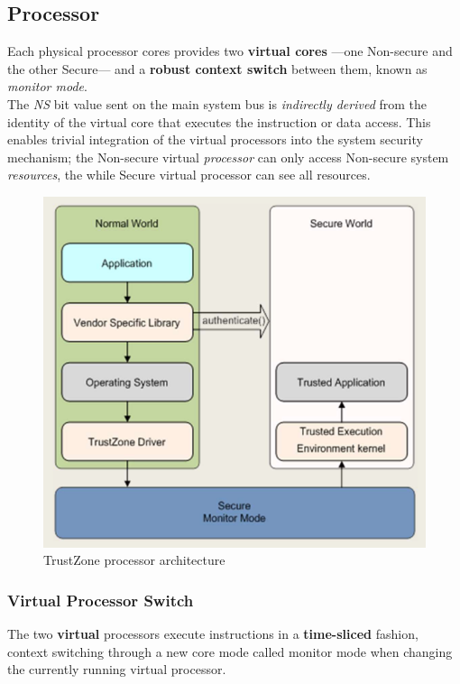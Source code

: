 \subsection{Processor}
Each physical processor cores provides
two \textbf{virtual cores} {---}one Non-secure and the other Secure{---}
and a \textbf{robust context switch} between them, known as \textit{monitor mode}.\\
The \textit{NS} bit value sent on the main system bus is \textit{indirectly derived} from
the identity of the virtual core that executes the instruction or data access.
This enables trivial integration of the virtual processors into the system security mechanism;
the Non-secure virtual \textit{processor} can only access Non-secure system
\textit{resources},
the while Secure virtual processor can see all resources.

\begin{figure}[htbp]
   \centering
   \includegraphics{images/TrustZone_processor.png}
   \caption{TrustZone processor architecture}
   \label{fig:TrustZone_processor}
\end{figure}

\subsubsection{Virtual Processor Switch}
The two \textbf{virtual} processors execute instructions in a \textbf{time-sliced} fashion, 
context switching through a new core mode called monitor mode when changing the currently running virtual processor.

